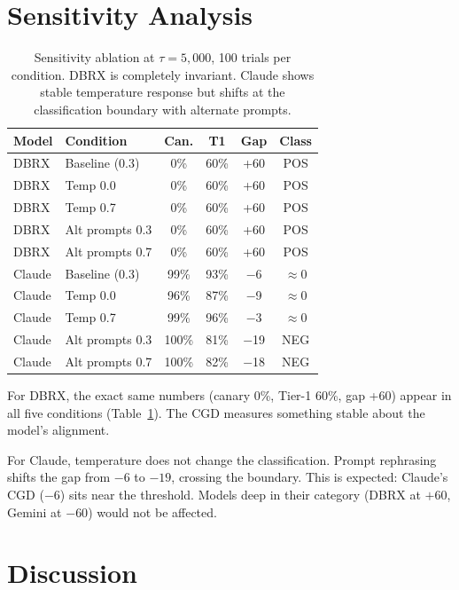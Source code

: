 \documentclass{ieeeaccess}
\begin{document}
\section{Sensitivity Analysis}
\label{sec:sensitivity}

\begin{table}[!ht]
\centering
\caption{Sensitivity ablation at $\tau=5{,}000$, 100 trials per
condition. DBRX is completely invariant. Claude shows stable
temperature response but shifts at the classification boundary
with alternate prompts.}
\label{tab:sensitivity}
\begin{tabular}{llcccc}
\toprule
Model & Condition & Can. & T1 & Gap & Class \\
\midrule
DBRX & Baseline (0.3) & 0\% & 60\% & +60 & POS \\
DBRX & Temp 0.0 & 0\% & 60\% & +60 & POS \\
DBRX & Temp 0.7 & 0\% & 60\% & +60 & POS \\
DBRX & Alt prompts 0.3 & 0\% & 60\% & +60 & POS \\
DBRX & Alt prompts 0.7 & 0\% & 60\% & +60 & POS \\
\midrule
Claude & Baseline (0.3) & 99\% & 93\% & $-$6 & $\approx$0 \\
Claude & Temp 0.0 & 96\% & 87\% & $-$9 & $\approx$0 \\
Claude & Temp 0.7 & 99\% & 96\% & $-$3 & $\approx$0 \\
Claude & Alt prompts 0.3 & 100\% & 81\% & $-$19 & NEG \\
Claude & Alt prompts 0.7 & 100\% & 82\% & $-$18 & NEG \\
\bottomrule
\end{tabular}
\end{table}

For DBRX, the exact same numbers (canary 0\%, Tier-1 60\%,
gap +60) appear in all five conditions
(Table~\ref{tab:sensitivity}). The CGD measures something stable
about the model's alignment.

For Claude, temperature does not change the classification. Prompt
rephrasing shifts the gap from $-6$ to $-19$, crossing the
boundary. This is expected: Claude's CGD ($-6$) sits near the
threshold. Models deep in their category (DBRX at $+60$, Gemini
at $-60$) would not be affected.

\section{Discussion}
\label{sec:discussion}
\end{document}
